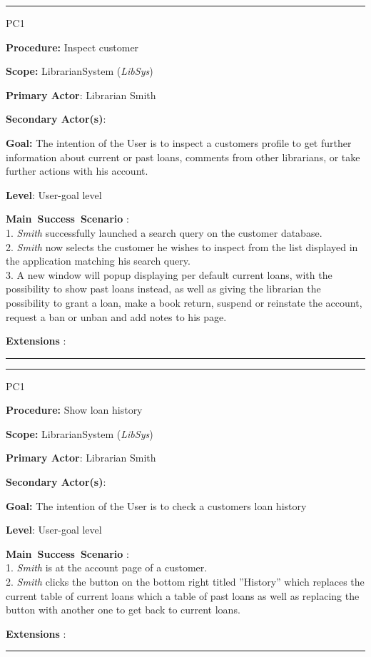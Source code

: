 \vspace{0.5cm}
\hrule
\begin{lyxlist}{PC1}
\small{
\item [\textbf{Procedure:}] Inspect customer
\item [\textbf{Scope:}] LibrarianSystem (\emph{LibSys})
\item [\textbf{Primary Actor}:] Librarian Smith
\item [\textbf{Secondary Actor(s)}:] 
\item [\textbf{Goal:}] The intention of the User is to inspect a customers
profile to get further information about current or past loans, comments from
other librarians, or take further actions with his account.
\item [\textbf{Level}:] User-goal level
\item [\textbf{Main~Success~Scenario}]:\\
1. \emph{Smith} successfully launched a search query on the customer database.\\
2. \emph{Smith} now selects the customer he wishes to inspect from the list
displayed in the application matching his search query.\\
3. A new window will popup displaying per default current loans, with the
possibility to show past loans instead, as well as giving the librarian
the possibility to grant a loan, make a book return, suspend or reinstate the
account, request a ban or unban and add notes to his page.\\


\item [\textbf{Extensions}]:\\
}

\end{lyxlist}
\hrule


\vspace{0.5cm}
\hrule
\begin{lyxlist}{PC1}
\small{
\item [\textbf{Procedure:}] Show loan history
\item [\textbf{Scope:}] LibrarianSystem (\emph{LibSys})
\item [\textbf{Primary Actor}:] Librarian Smith
\item [\textbf{Secondary Actor(s)}:] 
\item [\textbf{Goal:}] The intention of the User is to check a customers loan
history
\item [\textbf{Level}:] User-goal level
\item [\textbf{Main~Success~Scenario}]:\\
1. \emph{Smith} is at the account page of a customer.\\
2. \emph{Smith} clicks the button on the bottom right titled ''History'' which
replaces the current table of current loans which a table of past loans as well
as replacing the button with another one to get back to current loans.


\item [\textbf{Extensions}]:\\
}

\end{lyxlist}
\hrule


